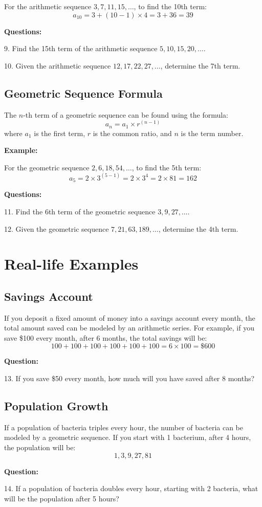 \documentclass[12pt]{article}
\begin{document}
For the arithmetic sequence \(3, 7, 11, 15, \ldots\), to find the 10th term:
\[
a_{10} = 3 + (10-1) \times 4 = 3 + 36 = 39
\]

\textbf{Questions:}

9. Find the 15th term of the arithmetic sequence \(5, 10, 15, 20, \ldots\).

10. Given the arithmetic sequence \(12, 17, 22, 27, \ldots\), determine the 7th term.

\subsection*{Geometric Sequence Formula}

The \(n\)-th term of a geometric sequence can be found using the formula:
\[
a_n = a_1 \times r^{(n-1)}
\]
where \(a_1\) is the first term, \(r\) is the common ratio, and \(n\) is the term number.

\textbf{Example:}

For the geometric sequence \(2, 6, 18, 54, \ldots\), to find the 5th term:
\[
a_5 = 2 \times 3^{(5-1)} = 2 \times 3^4 = 2 \times 81 = 162
\]

\textbf{Questions:}

11. Find the 6th term of the geometric sequence \(3, 9, 27, \ldots\).

12. Given the geometric sequence \(7, 21, 63, 189, \ldots\), determine the 4th term.

\newpage

\section*{Real-life Examples}

\subsection*{Savings Account}

If you deposit a fixed amount of money into a savings account every month, the total amount saved can be modeled by an arithmetic series. For example, if you save \$100 every month, after 6 months, the total savings will be:
\[
100 + 100 + 100 + 100 + 100 + 100 = 6 \times 100 = \$600
\]

\textbf{Question:}

13. If you save \$50 every month, how much will you have saved after 8 months?

\subsection*{Population Growth}

If a population of bacteria triples every hour, the number of bacteria can be modeled by a geometric sequence. If you start with 1 bacterium, after 4 hours, the population will be:
\[
1, 3, 9, 27, 81
\]

\textbf{Question:}

14. If a population of bacteria doubles every hour, starting with 2 bacteria, what will be the population after 5 hours?
\end{document}
